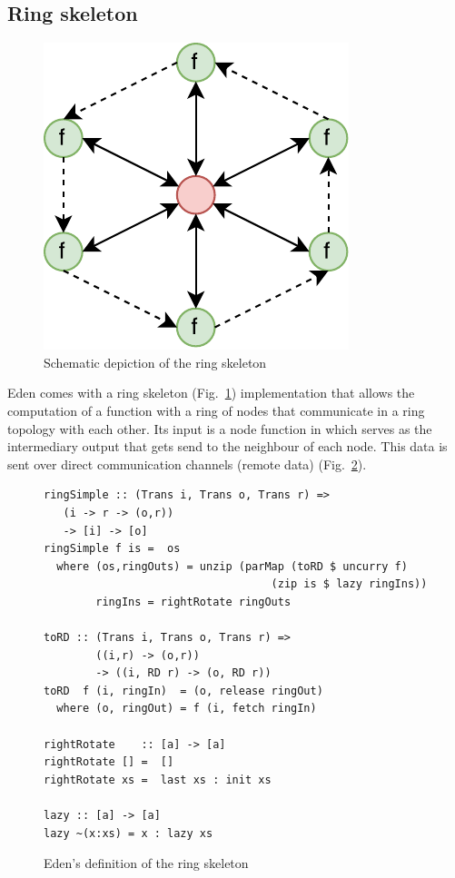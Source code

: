 \subsection{Ring skeleton} \label{sec:ring}
\begin{figure}[h]
	\includegraphics[scale=0.75]{images/ring}
	\caption{Schematic depiction of the ring skeleton}
	\label{fig:ringImg}
\end{figure}
Eden comes with a ring skeleton (Fig.~\ref{fig:ringImg}) implementation that allows the computation of a function \inlinecode{[i] -> [o]} with a ring of nodes that communicate in a ring topology with each other. Its input is a node function  in which  serves as the intermediary output that gets send to the neighbour of each node. This data is sent over direct communication channels (remote data) (Fig.~\ref{fig:ringEden}).
\begin{figure}[h]
\begin{lstlisting}[frame=htrbl]
ringSimple :: (Trans i, Trans o, Trans r) =>
   (i -> r -> (o,r))
   -> [i] -> [o]
ringSimple f is =  os
  where (os,ringOuts) = unzip (parMap (toRD $ uncurry f)
                                   (zip is $ lazy ringIns))
        ringIns = rightRotate ringOuts

toRD :: (Trans i, Trans o, Trans r) => 
        ((i,r) -> (o,r))
        -> ((i, RD r) -> (o, RD r))
toRD  f (i, ringIn)  = (o, release ringOut)
  where (o, ringOut) = f (i, fetch ringIn)

rightRotate    :: [a] -> [a]
rightRotate [] =  []
rightRotate xs =  last xs : init xs

lazy :: [a] -> [a]
lazy ~(x:xs) = x : lazy xs
\end{lstlisting}
\caption{Eden's definition of the ring skeleton \citep{eden_skel_topology}}
\label{fig:ringEden}
\end{figure}


